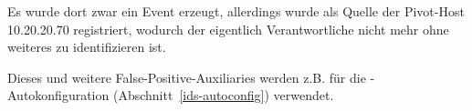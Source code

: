 Es wurde dort zwar ein Event erzeugt,
allerdings wurde als Quelle der Pivot-Host 10.20.20.70 registriert,
wodurch der eigentlich Verantwortliche nicht mehr ohne weiteres zu
identifizieren ist.

Dieses und weitere False-Positive-Auxiliaries werden z.B. für die
-Autokonfiguration (Abschnitt~\ref{ids-autoconfig}) verwendet.

